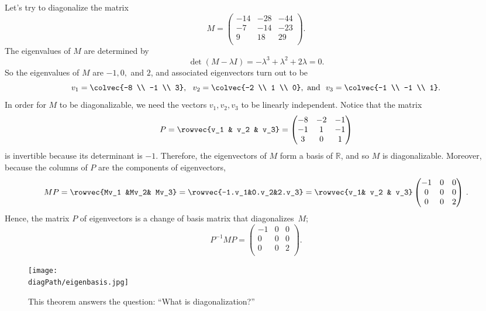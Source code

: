 \begin{example}
Let's try to diagonalize the matrix
\[M=\begin{pmatrix}
-14 & -28 & -44 \\
-7 & -14 & -23 \\
9 & 18 & 29 \\
\end{pmatrix}.\]
The eigenvalues of \(M\) are determined by \[\det(M-\lambda I)=-\lambda^3+\lambda^2+2\lambda=0.\]
So the eigenvalues of \(M\) are \(-1,0,\) and \(2\), and associated eigenvectors turn out to be 
\[
v_1=\colvec{-8 \\ -1 \\ 3},~~ v_2=\colvec{-2 \\ 1 \\ 0}, \text{~and~~} v_3=\colvec{-1 \\ -1 \\ 1}.
\] 
In order for \(M\) to be diagonalizable, we need the vectors \(v_1, v_2, v_3\) to be linearly independent. Notice that the matrix
\[P=\rowvec{v_1 & v_2 & v_3}=\begin{pmatrix}
-8 & -2 & -1 \\
-1 & 1 & -1 \\
3 & 0 & 1 \\
\end{pmatrix}\]
is invertible because its determinant is \(-1\). Therefore, the eigenvectors of \(M\) form a basis of \(\mathbb{R}\), and so \(M\) is diagonalizable. 
Moreover, because the columns of $P$ are the components of eigenvectors, 
\[
MP=\rowvec{Mv_1 &Mv_2& Mv_3}=\rowvec{-1.v_1&0.v_2&2.v_3}=\rowvec{v_1& v_2 & v_3}\begin{pmatrix}
-1 & 0 & 0 \\
0 & 0 & 0 \\
0 & 0 & 2 \\
\end{pmatrix}\, .
\]
Hence, the matrix \(P\) of eigenvectors is a change of basis matrix that diagonalizes~\(M\);
\[P^{-1}MP=\begin{pmatrix}
-1 & 0 & 0 \\
0 & 0 & 0 \\
0 & 0 & 2 \\
\end{pmatrix}.\]
\end{example}


\begin{figure}
\begin{center}
\texttt{[image: \\diagPath/eigenbasis.jpg]}
\end{center}
\caption{This theorem answers the question: ``What is diagonalization?''}
\end{figure}

